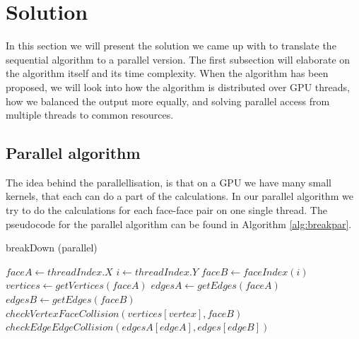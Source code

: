 \section{Solution}
In this section we will present the solution we came up with to translate the sequential algorithm to a parallel version. The first subsection will elaborate on the algorithm itself and its time complexity. When the algorithm has been proposed, we will look into how the algorithm is distributed over GPU threads, how we balanced the output more equally, and solving parallel access from multiple threads to common resources.

\subsection{Parallel algorithm}
The idea behind the parallellisation, is that on a GPU we have many small kernels, that each can do a part of the calculations. In our parallel algorithm we try to do the calculations for each face-face pair on one single thread. The pseudocode for the parallel algorithm can be found in Algorithm \ref{alg:breakpar}.

\begin{algorithm}
\caption{breakDown (parallel)}\label{alg:breakpar}
\begin{algorithmic}[1]
    \State $faceA \gets threadIndex.X$
    \State $i \gets threadIndex.Y$
    \State $faceB \gets faceIndex(i)$ 
    \State $vertices \gets getVertices(faceA)$
    \State $edgesA \gets getEdges(faceA)$
    \State $edgesB \gets getEdges(faceB)$
            \State $checkVertexFaceCollision(vertices[vertex], faceB)$
        \EndFor
                    \State $checkEdgeEdgeCollision(edgesA[edgeA], edges[edgeB])$
                \EndIf
            \EndFor
        \EndFor
\EndProcedure
\end{algorithmic}
\end{algorithm}

